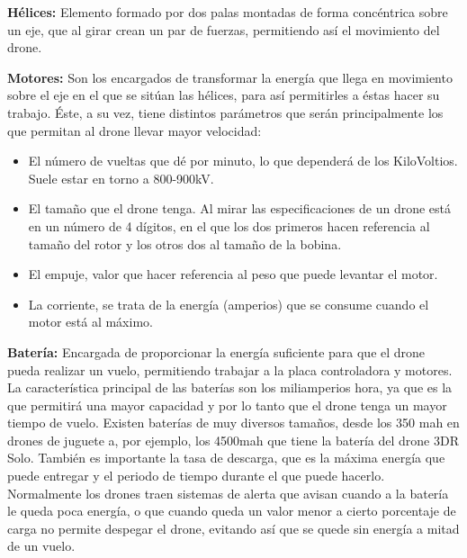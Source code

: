 \hspace{1 cm}\textbf{H\'elices:} Elemento formado por dos palas montadas de forma conc\'entrica sobre un eje, que al girar crean un par de fuerzas, permitiendo as\'i el movimiento del drone.

\hspace{1 cm}\textbf{Motores:} Son los encargados de transformar la energ\'ia que llega en movimiento sobre el eje en el que se sit\'uan las h\'elices, para as\'i permitirles a \'estas hacer su trabajo. \'Este, a su vez, tiene distintos par\'ametros que ser\'an principalmente los que permitan al drone llevar mayor velocidad: 

\begin{itemize}
\item El n\'umero de vueltas que d\'e por minuto, lo que depender\'a de los KiloVoltios. Suele estar en torno a 800-900kV.

\item El tamaño que el drone tenga. Al mirar las especificaciones de un drone est\'a en un n\'umero de 4 d\'igitos, en el que los dos primeros hacen referencia al tamaño del rotor y los otros dos al tamaño de la bobina. 

\item El empuje, valor que hacer referencia al peso que puede levantar el motor.

\item La corriente, se trata de la energ\'ia (amperios) que se consume cuando el motor est\'a al m\'aximo.
\end{itemize}

\hspace{1 cm}\textbf{Bater\'ia:} Encargada de proporcionar la energ\'ia suficiente para que el drone pueda realizar un vuelo, permitiendo trabajar a la placa controladora y motores. La caracter\'istica principal de las bater\'ias son los miliamperios hora, ya que es la que permitir\'a una mayor capacidad y por lo tanto que el drone tenga un mayor tiempo de vuelo. Existen bater\'ias de muy diversos tamaños, desde los 350 mah en drones de juguete a, por ejemplo, los 4500mah que tiene la bater\'ia del drone 3DR Solo. Tambi\'en es importante la tasa de descarga, que es la m\'axima energ\'ia que puede entregar y el periodo de tiempo durante el que puede hacerlo. Normalmente los drones traen sistemas de alerta que avisan cuando a la bater\'ia le queda poca energ\'ia, o que cuando queda un valor menor a cierto porcentaje de carga no permite despegar el drone, evitando as\'i que se quede sin energ\'ia a mitad de un vuelo.


